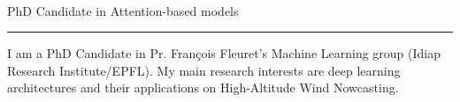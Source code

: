 \documentclass{article}
\let\oldhrule\hrule
\renewcommand{\hrule}{\color{lightgray}\oldhrule\color{black}}
\begin{document}
\begin{minipage}{0.2\textwidth}

\end{minipage}
\begin{minipage}{0.7\textwidth}
  \centering

   \\ \vspace{3mm}
  \sc \montserratthin PhD Candidate in Attention-based models
\end{minipage}

\vspace{4mm}
\hrule

\vspace{4mm}
\color{deepgray}
I am a PhD Candidate in Pr. François Fleuret's Machine Learning group (Idiap Research Institute/EPFL). My main research interests are deep learning architectures and their applications on High-Altitude Wind Nowcasting. \\
\end{document}

